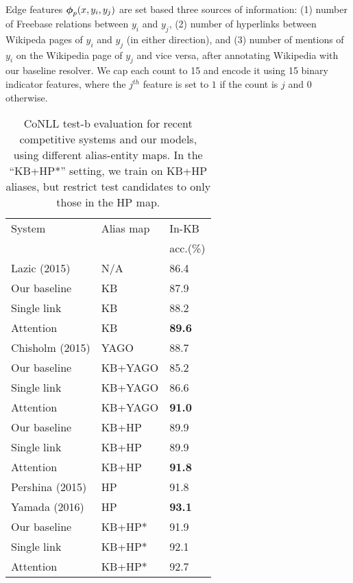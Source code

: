 {Edge features} $\boldsymbol{\phi}_p(x,y_i,y_j)$ are set based three sources of information: (1) number of Freebase relations between $y_i$ and $y_j$, (2) number of hyperlinks between Wikipeda pages of $y_i$ and $y_j$ (in either direction), and
(3) number of mentions of $y_i$ on the Wikipedia page of $y_j$ and vice versa, after
annotating  Wikipedia with our baseline resolver. 
We cap each count to 15 and encode it using 15 binary indicator features,
where the $j^{th}$ feature is set to $1$ if the count is $j$ and $0$ otherwise.


\begin{table}[t!]
  \centering
  \begin{tabular}{l|l|l}
    System                 &  Alias map  & In-KB  \\
    & & acc.(\%) \\
    \hline
    Lazic (2015)    & N/A          & 86.4 \\
    \hline
    Our baseline    & KB           & 87.9  \\
    Single link     & KB           & 88.2 \\
    Attention       & KB           & \textbf{89.6} \\
    \hline
        Chisholm (2015) & YAGO         & 88.7 \\ 
    Our baseline    & KB+YAGO      & 85.2 \\
    Single link     & KB+YAGO      & 86.6 \\
    Attention       & KB+YAGO      & {\bf 91.0} \\
    \hline
    Our baseline    & KB+HP        & 89.9 \\
    Single link & KB+HP & 89.9 \\
    Attention       & KB+HP        & {\bf 91.8} \\
    \hline
        Pershina (2015) & HP           & 91.8 \\
        Yamada (2016) & HP & {\bf 93.1} \\
    Our baseline &KB+HP* & 91.9 \\
    Single link     & KB+HP*       & 92.1 \\
    Attention       & KB+HP*       & {92.7} 
  \end{tabular}
\caption{CoNLL test-b evaluation for recent competitive systems and
  our models, using different alias-entity maps.  In the ``KB+HP*''
  setting, we train on KB+HP aliases, but restrict test candidates to
  only those in the HP map.}
 \label{table:conll_results} 
\end{table}

